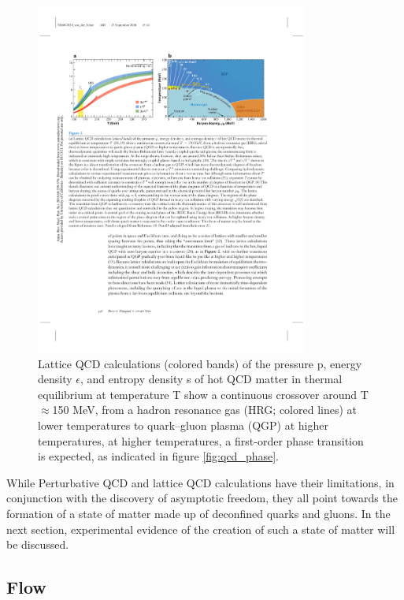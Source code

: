 \begin{figure}[htpb]
  \centering
  \includegraphics[width=0.8\textwidth]{Introduction/lattice_qcd.pdf}
  \caption{Lattice QCD calculations (colored bands) of the pressure p, energy density $\epsilon$, and entropy density s of hot QCD matter in thermal equilibrium at temperature T \cite{Borsanyi2014,HotQCDCollaboration2014} show a continuous crossover around T$\approx$150 MeV, from a hadron resonance gas (HRG; colored lines) at lower temperatures to quark–gluon plasma (QGP) at higher temperatures, at higher temperatures, a first-order phase transition is expected, as indicated in figure \ref{fig:qcd_phase}.}
  \label{fig:lattice_qcd}
\end{figure}


While Perturbative QCD and lattice QCD calculations have their limitations, in conjunction with the discovery of asymptotic freedom, they all point towards the formation of a state of matter made up of deconfined quarks and gluons. In the next section, experimental evidence of the creation of such a state of matter will be discussed. 

\subsection{Flow}\label{sec:flow}

